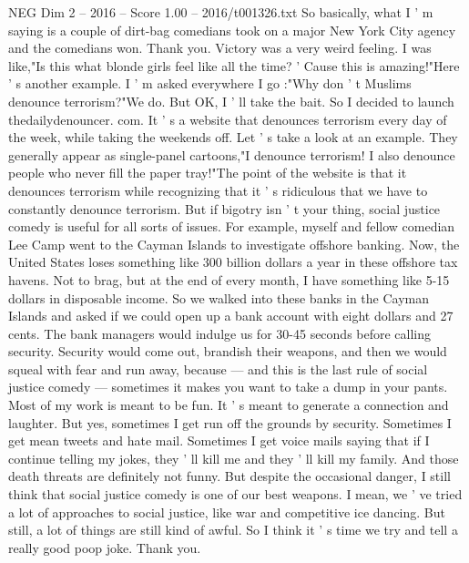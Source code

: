\begin{textsample}{NEG Dim 2 – 2016 – Score 1.00 – 2016/t001326.txt}
So basically, what I ' m saying is a couple of dirt-bag comedians took on a major New York City agency and the comedians won.
Thank you.
Victory was a very weird feeling.
I was like,"Is this what blonde girls feel like all the time? ' Cause this is amazing!"Here ' s another example.
I ' m asked everywhere I go :"Why don ' t Muslims denounce terrorism?"We do.
But OK, I ' ll take the bait.
So I decided to launch thedailydenouncer. com.
It ' s a website that denounces terrorism every day of the week, while taking the weekends off.
Let ' s take a look at an example.
They generally appear as single-panel cartoons,"I denounce terrorism!
I also denounce people who never fill the paper tray!"The point of the website is that it denounces terrorism while recognizing that it ' s ridiculous that we have to constantly denounce terrorism.
But if bigotry isn ' t your thing, social justice comedy is useful for all sorts of issues.
For example, myself and fellow comedian Lee Camp went to the Cayman Islands to investigate offshore banking.
Now, the United States loses something like 300 billion dollars a year in these offshore tax havens.
Not to brag, but at the end of every month, I have something like 5-15 dollars in disposable income.
So we walked into these banks in the Cayman Islands and asked if we could open up a bank account with eight dollars and 27 cents.
The bank managers would indulge us for 30-45 seconds before calling security.
Security would come out, brandish their weapons, and then we would squeal with fear and run away, because — and this is the last rule of social justice comedy — sometimes it makes you want to take a dump in your pants.
Most of my work is meant to be fun.
It ' s meant to generate a connection and laughter.
But yes, sometimes I get run off the grounds by security.
Sometimes I get mean tweets and hate mail.
Sometimes I get voice mails saying that if I continue telling my jokes, they ' ll kill me and they ' ll kill my family.
And those death threats are definitely not funny.
But despite the occasional danger, I still think that social justice comedy is one of our best weapons.
I mean, we ' ve tried a lot of approaches to social justice, like war and competitive ice dancing.
But still, a lot of things are still kind of awful.
So I think it ' s time we try and tell a really good poop joke.
Thank you.

\end{textsample}
